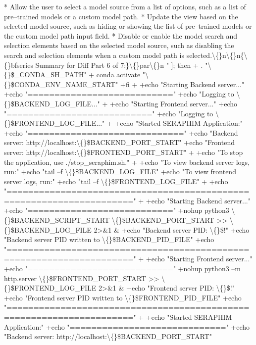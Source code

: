 \documentclass{article}
\begin{document}
{* Allow the user to select a model source from a list of options, such as a list of pre--trained models or a custom model path.
* Update the view based on the selected model source, such as hiding or showing the list of pre--trained models or the custom model path input field.
* Disable or enable the model search and selection elements based on the selected model source, such as disabling the search and selection elements when a custom model path is selected.\textbackslash\{\}n\textbackslash\{\}n\{\textbackslash\{\}bfseries Summary for Diff Part 6 of 7:\}\textbackslash\{\}par\textbackslash\{\}n  " ]; then
+    . "\textbackslash\{\}\$\_CONDA\_SH\_PATH"
+    conda activate "\textbackslash\{\}\$CONDA\_ENV\_NAME\_START"
+fi
+
+echo "Starting Backend server..."
+echo "==========================="
+echo "Logging to \textbackslash\{\}\$BACKEND\_LOG\_FILE..."
+
+echo "Starting Frontend server..."
+echo "==========================="
+echo "Logging to \textbackslash\{\}\$FRONTEND\_LOG\_FILE..."
+
+echo "Started SERAPHIM Application:"
+echo "============================="
+echo "Backend server: http://localhost:\textbackslash\{\}\$BACKEND\_PORT\_START"
+echo "Frontend server: http://localhost:\textbackslash\{\}\$FRONTEND\_PORT\_START"
+
+echo "To stop the application, use ./stop\_seraphim.sh."
+
+echo "To view backend server logs, run:"
+echo "tail --f \textbackslash\{\}\$BACKEND\_LOG\_FILE"
+echo "To view frontend server logs, run:"
+echo "tail --f \textbackslash\{\}\$FRONTEND\_LOG\_FILE"
+
+echo "====================================================================="
+
+echo "Starting Backend server..."
+echo "==========================="
+nohup python3 \textbackslash\{\}\$BACKEND\_SCRIPT\_START \textbackslash\{\}\$BACKEND\_PORT\_START \textgreater{}\textgreater{} \textbackslash\{\}\$BACKEND\_LOG\_FILE 2\textgreater{}\&1 \&
+echo "Backend server PID: \textbackslash\{\}\$!"
+echo "Backend server PID written to \textbackslash\{\}\$BACKEND\_PID\_FILE"
+echo "====================================================================="
+
+echo "Starting Frontend server..."
+echo "==========================="
+nohup python3 --m http.server \textbackslash\{\}\$FRONTEND\_PORT\_START \textgreater{}\textgreater{} \textbackslash\{\}\$FRONTEND\_LOG\_FILE 2\textgreater{}\&1 \&
+echo "Frontend server PID: \textbackslash\{\}\$!"
+echo "Frontend server PID written to \textbackslash\{\}\$FRONTEND\_PID\_FILE"
+echo "====================================================================="
+
+echo "Started SERAPHIM Application:"
+echo "============================="
+echo "Backend server: http://localhost:\textbackslash\{\}\$BACKEND\_PORT\_START"
}
\end{document}
